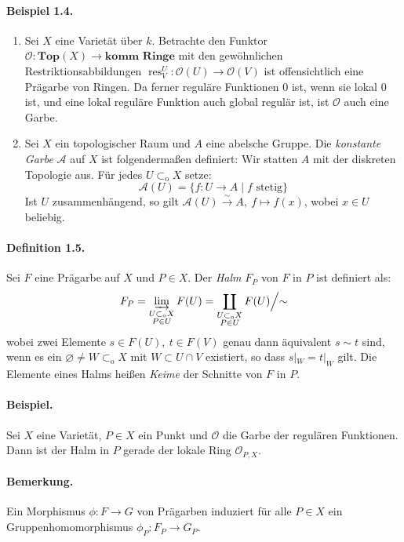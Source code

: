 \paragraph{Beispiel 1.4.}\label{1.4} \begin{enumerate}
\item Sei $X$ eine Varietät über $k$. Betrachte den Funktor $\mathcal{O}:\textbf{Top$(X)$}\to\textbf{komm Ringe}$ mit den gewöhnlichen Restriktionsabbildungen $\operatorname{res}^U_V:\mathcal{O}(U)\to\mathcal{O}(V)$ ist offensichtlich eine Prägarbe von Ringen. Da ferner reguläre Funktionen $0$ ist, wenn sie lokal $0$ ist, und eine lokal reguläre Funktion auch global regulär ist, ist $\mathcal{O}$ auch eine Garbe.
\item Sei $X$ ein topologischer Raum und $A$ eine abelsche Gruppe. Die \textit{konstante Garbe} $\mathcal{A}$ auf $X$ ist folgendermaßen definiert: Wir statten $A$ mit der diskreten Topologie aus. Für jedes $U\subset_\text{o}X$ setze:
\[\mathcal{A}(U)=\{f:U\to A\mid f\text{ stetig}\} \]
Ist $U$ zusammenhängend, so gilt $\mathcal{A}(U)\stackrel{\sim}{\to} A,\ f\mapsto f(x)$, wobei $x\in U$ beliebig.
\end{enumerate}

\paragraph{Definition 1.5.}\label{1.5} Sei $F$ eine Prägarbe auf $X$ und $P\in X$. Der \textit{Halm} $F_P$ von $F$ in $P$ ist definiert als:
\[F_P =\varinjlim_{\substack{U\subset_\text{o}X\\ P\in U}} F(U)=\coprod_{\substack{U\subset_\text{o}X\\ P\in U}} F(U)\Big/{\sim} \]
wobei zwei Elemente $s\in F(U),\ t\in F(V)$ genau dann äquivalent $s\sim t$ sind, wenn es ein $\varnothing \neq W\subset_\text{o}X$ mit $W\subset U\cap V$ existiert, so dass $s|_W=t|_W$ gilt. Die Elemente eines Halms heißen \textit{Keime} der Schnitte von $F$ in $P$.

\paragraph{Beispiel.} Sei $X$ eine Varietät, $P\in X$ ein Punkt und $\mathcal{O}$ die Garbe der regulären Funktionen. Dann ist der Halm in $P$ gerade der lokale Ring $\mathcal{O}_{P,X}$.

\paragraph{Bemerkung.} Ein Morphismus $\phi:F\to G$ von Prägarben induziert für alle $P\in X$ ein Gruppenhomomorphismus $\phi_P:F_P\to G_P$.


